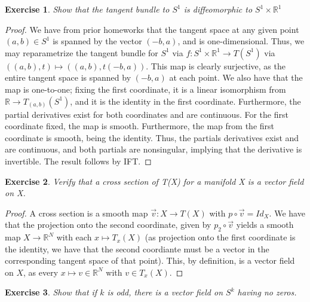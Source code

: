 \documentclass{article}
\newtheorem{exercise}{Exercise}
\begin{document}
            \begin{exercise}
              Show that the tangent bundle to $S^{1}$ is diffeomorphic to $S^{1} \times \mathbb{R}^{1}$
              \end{exercise}

              \begin{proof}
                We have from prior homeworks that the tangent space at any given point $(a,b) \in S^{1}$ is spanned by the vector $(-b,a)$, and is one-dimensional. Thus, we may reparametrize the tangent bundle for $S^{1}$ via $f: S^{1}\times \mathbb{R}^{1} \to T(S^{1})$ via $((a,b),t) \mapsto ((a,b), t(-b,a))$. This map is clearly surjective, as the entire tangent space is spanned by $(-b,a)$ at each point. We also have that the map is one-to-one; fixing the first coordinate, it is a linear isomorphism from $\mathbb{R} \to T_{(a,b)}(S^{1})$, and it is the identity in the first coordinate. Furthermore, the partial derivatives exist for both coordinates and are continuous. For the first coordinate fixed, the map is smooth. Furthermore, the map from the first coordinate is smooth, being the identity. Thus, the partials derivatives exist and are continuous, and both partials are nonsingular, implying that the derivative is invertible. The result follows by IFT. 
              \end{proof}

              \begin{exercise}
                Verify that a cross section of T(X) for a manifold X is a vector field on X.
                \end{exercise}

                \begin{proof}
                  A cross section is a smooth map $\vec{v}: X \to T(X)$ with $p \circ \vec{v} = Id_{X}$. We have that the projection onto the second coordinate, given by $p_{2} \circ \vec{v}$ yields a smooth map $X \to \mathbb{R}^{N}$ with each $x \mapsto T_{x}(X)$ (as projection onto the first coordinate is the identity, we have that the second coordiante must be a vector in the corresponding tangent space of that point). This, by definition, is a vector field on $X$, as every $x \mapsto v \in \mathbb{R}^{N}$ with $v \in T_{x}(X)$.   
                \end{proof}

                \begin{exercise}
                  Show that if $k$ is odd, there is a vector field on $S^{k}$ having no zeros.
                \end{exercise}
\end{document}
